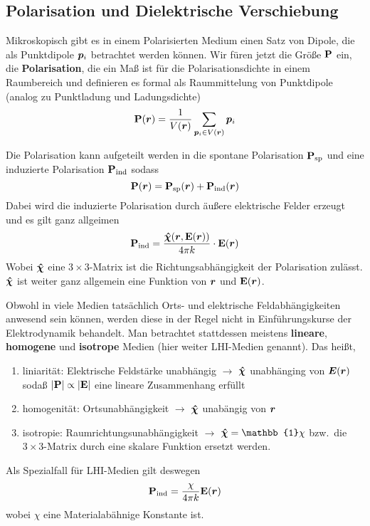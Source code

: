 \subsection{Polarisation und Dielektrische Verschiebung}%
\label{sub:Polarisation}
Mikroskopisch gibt es in einem Polarisierten Medium einen Satz von Dipole,
die als Punktdipole $\vb*p_i$ betrachtet werden können. Wir füren jetzt die
Größe $\vb P$ ein, die \textbf{Polarisation}, die ein Maß ist für die 
Polarisationsdichte in einem Raumbereich und definieren es formal als 
Raummittelung von Punktdipole (analog zu Punktladung und Ladungsdichte) 
\begin{equation}
  \vb P(\vb*r) = \frac{1}{V(\vb*r)}\sum_{\vb*p_i\in V(\vb*r)} \vb*p_i
\end{equation}

Die Polarisation kann aufgeteilt werden in die spontane Polarisation 
$\vb P_\text{sp}$ und eine induzierte Polarisation $\vb P_\text{ind}$ sodass
\begin{equation}
  \vb P(\vb*r) = \vb P_\text{sp}(\vb*r) + \vb P_\text{ind}(\vb*r)
\end{equation}
Dabei wird die induzierte Polarisation durch äußere elektrische Felder erzeugt
und es gilt ganz allgeimen
\begin{equation}
  \vb P_\text{ind} = \frac{\vu*\chi\qty(\vb*r, \vb E(\vb*r))}{4\pi k} \cdot \vb E(\vb*r)
\end{equation}
Wobei $\vu*\chi$ eine $3\times3$-Matrix ist die Richtungsabhängigkeit der
Polarisation zulässt. $\vu*\chi$ ist weiter ganz allgemein eine Funktion
von $\vb*r$ und $\vb E(\vb*r)$. 
\clearpage

Obwohl in viele Medien tatsächlich Orts-
und elektrische Feldabhängigkeiten anwesend sein können, werden diese in
der Regel nicht in Einführungskurse der Elektrodynamik behandelt. Man 
betrachtet stattdessen meistens \textbf{lineare}, \textbf{homogene} und 
\textbf{isotrope} Medien (hier weiter LHI-Medien genannt). Das heißt,
\begin{enumerate}
  \item liniarität: Elektrische Feldstärke unabhängig $\rightarrow$
    $\vu*\chi$ unabhänging
    von $\vb*E(\vb*r)$ sodaß $\abs{\vb P} 
    \propto \abs{\vb E}$ eine lineare Zusammenhang erfüllt
  \item homogenität: Ortsunabhängigkeit $\rightarrow$ 
    $\vu*\chi$ unabängig von $\vb*r$
  \item isotropie: Raumrichtungsunabhängigkeit $\rightarrow$ 
    $\vu*\chi=\mathbb{1}\chi$ bzw.\ die $3\times3$-Matrix 
    durch eine skalare Funktion ersetzt werden.
\end{enumerate}
Als Spezialfall für LHI-Medien gilt deswegen
\begin{equation}
  \vb P_\text{ind} = \frac{\chi}{4\pi k} \vb E(\vb*r)
\end{equation}
wobei $\chi$ eine Materialabähnige Konstante ist.

